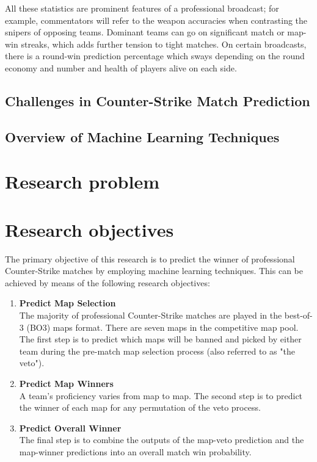 All these statistics are prominent features of a professional broadcast; for example, commentators will refer to the weapon accuracies when contrasting the snipers of opposing teams. Dominant teams can go on significant match or map-win streaks, which adds further tension to tight matches. On certain broadcasts, there is a round-win prediction percentage which sways depending on the round economy and number and health of players alive on each side.

\subsection{Challenges in Counter-Strike Match Prediction}

\subsection{Overview of Machine Learning Techniques}

\section{Research problem}

\section{Research objectives}

The primary objective of this research is to predict the winner of professional Counter-Strike matches by employing machine learning techniques. This can be achieved by means of the following research objectives:

\begin{enumerate}
	\item \textbf{Predict Map Selection}\\
	The majority of professional Counter-Strike matches are played in the best-of-3 (BO3) maps format. There are seven maps in the competitive map pool. The first step is to predict which maps will be banned and picked by either team during the pre-match map selection process (also referred to as "the veto").
	\item \textbf{Predict Map Winners}\\
	A team's proficiency varies from map to map. The second step is to predict the winner of each map for any permutation of the veto process.
	\item \textbf{Predict Overall Winner}\\
	The final step is to combine the outputs of the map-veto prediction and the map-winner predictions into an overall match win probability.
\end{enumerate}

